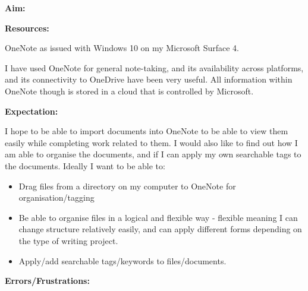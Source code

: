 \documentclass{article}
\begin{document}
\textbf{Aim:}


\textbf{Resources:}

OneNote as issued with Windows 10 on my Microsoft Surface 4.

I have used OneNote for general note-taking, and its availability across platforms, and its connectivity to OneDrive have been very useful. All information within OneNote though is stored in a cloud that is controlled by Microsoft. 

\textbf{Expectation:}

I hope to be able to import documents into OneNote to be able to view them easily while completing work related to them. I would also like to find out how I am able to organise the documents, and if I can apply my own searchable tags to the documents.
Ideally I want to be able to:
\begin{itemize}
    \item Drag files from a directory on my computer to OneNote for organisation/tagging
    \item Be able to organise files in a logical and flexible way - flexible meaning I can change structure relatively easily, and can apply different forms depending on the type of writing project.
    \item Apply/add searchable tags/keywords to files/documents.
\end{itemize}

\label{Error: OneNote Errors/Frustrations}
\textbf{Errors/Frustrations:}
\end{document}
